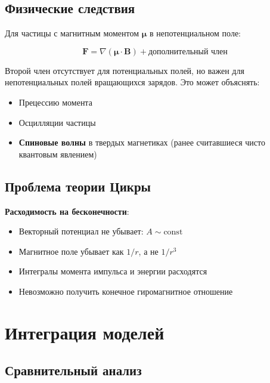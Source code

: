 \documentclass[12pt,a4paper]{article}
\begin{document}
\subsection{Физические следствия}

Для частицы с магнитным моментом $\boldsymbol{\mu}$ в непотенциальном поле:

\begin{equation}
    \mathbf{F} = \nabla(\boldsymbol{\mu} \cdot \mathbf{B}) + \text{дополнительный член}
\end{equation}

Второй член отсутствует для потенциальных полей, но важен для непотенциальных полей вращающихся зарядов. Это может объяснять:
\begin{itemize}
    \item Прецессию момента
    \item Осцилляции частицы
    \item \textbf{Спиновые волны} в твердых магнетиках (ранее считавшиеся чисто квантовым явлением)
\end{itemize}

\subsection{Проблема теории Цикры}

\textbf{Расходимость на бесконечности}:
\begin{itemize}
    \item Векторный потенциал не убывает: $A \sim \text{const}$
    \item Магнитное поле убывает как $1/r$, а не $1/r^3$
    \item Интегралы момента импульса и энергии расходятся
    \item Невозможно получить конечное гиромагнитное отношение
\end{itemize}

\section{Интеграция моделей}

\subsection{Сравнительный анализ}
\end{document}

